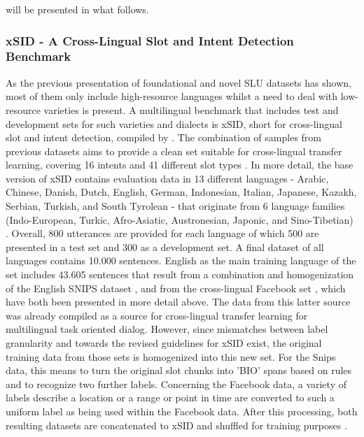 \documentclass[11pt,a4paper,twoside,openright]{scrbook}
\begin{document}
will be presented in what follows.






\subsubsection{xSID - A Cross-Lingual Slot and Intent Detection Benchmark}

As the previous presentation of foundational and novel SLU datasets has shown, most of them only include high-resource languages whilst a need to deal with low-resource varieties is present. A multilingual benchmark that includes test and development sets for such varieties and dialects is xSID, short for cross-lingual slot and intent detection, compiled by \citet{van-der-goot-etal-2021-masked}. The combination of samples from previous datasets aims to provide a clean set suitable for cross-lingual transfer learning, covering 16 intents and 41 different slot types \citep{larson2022survey}. In more detail, the base version of xSID contains evaluation data in 13 different languages - Arabic, Chinese, Danish, Dutch, English, German, Indonesian, Italian, Japanese, Kazakh, Serbian, Turkish, and South Tyrolean - that originate from 6 language families (Indo-European, Turkic, Afro-Asiatic, Austronesian, Japonic, and Sino-Tibetian) \citep{van-der-goot-etal-2021-masked}. Overall, 800 utterances are provided for each language of which 500 are presented in a test set and 300 as a development set. A final dataset of all languages contains 10.000 sentences. English as the main training language of the set includes 43.605 sentences that result from a combination and homogenization of the English SNIPS dataset \citep{coucke2018snips}, and from the cross-lingual Facebook set \citep{schuster-etal-2019-cross-lingual}, which have both been presented in more detail above. The data from this latter source was already compiled as a source for cross-lingual transfer learning for multilingual task oriented dialog. 
However, since mismatches between label granularity and towards the revised guidelines for xSID exist, the original training data from those sets is homogenized into this new set. For the Snips data, this means to turn the original slot chunks into 'BIO' spans based on rules and to recognize two further labels. Concerning the Facebook data, a variety of labels describe a location or a range or point in time are converted to such a uniform label as being used within the Facebook data. After this processing, both resulting datasets are concatenated to xSID and shuffled for training purposes \citep{van-der-goot-etal-2021-masked}. 
\end{document}
